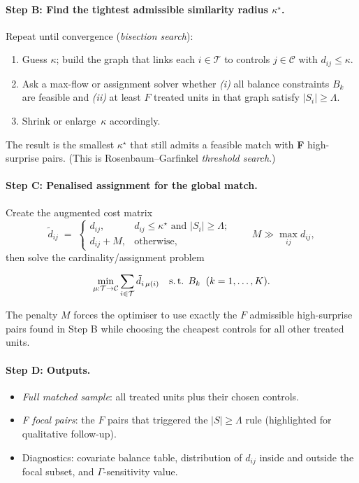 \documentclass[12pt,letterpaper]{article}  %
\begin{document}
\paragraph{Step B: Find the tightest admissible similarity radius $\kappa^\star$.}
Repeat until convergence (\emph{bisection search}):
\begin{enumerate}[label=\arabic*.]
    \item Guess $\kappa$; build the graph that links each $i\in\mathcal{T}$ to controls
          $j\in\mathcal{C}$ with $d_{ij}\le\kappa$.
    \item Ask a max-flow or assignment solver whether
          \emph{(i)} all balance constraints $B_k$ are feasible and
          \emph{(ii)} at least $F$ treated units in that graph satisfy
          $|S_i|\ge\Lambda$.
    \item Shrink or enlarge~$\kappa$ accordingly.
\end{enumerate}
The result is the smallest $\kappa^\star$ that still admits a feasible match with
\textbf{F} high-surprise pairs.  (This is Rosenbaum–Garfinkel
\emph{threshold search}.)

\paragraph{Step C: Penalised assignment for the global match.}
Create the augmented cost matrix
\[
\tilde d_{ij}\;=\;
\begin{cases}
    d_{ij}, & d_{ij}\le\kappa^\star\text{ and }|S_i|\ge\Lambda;\\[2pt]
    d_{ij}+M, & \text{otherwise},
\end{cases}
\qquad
M\gg\max\limits_{ij}d_{ij},
\]
then solve the cardinality/assignment problem

\[
\min_{\mu:\mathcal{T}\to\mathcal{C}}
        \sum_{i\in\mathcal{T}}\tilde d_{i\,\mu(i)}
\quad
\text{s.\,t. } B_k\;\;(k=1,\dots,K).
\]

The penalty $M$ forces the optimiser to use exactly the \(F\) admissible
high-surprise pairs found in Step B while choosing the cheapest controls for all
other treated units.

\paragraph{Step D: Outputs.}
\begin{itemize}[leftmargin=1.3em]
    \item \emph{Full matched sample}: all treated units plus their chosen controls.
    \item \emph{F focal pairs}: the \(F\) pairs that triggered the \(|S|\ge\Lambda\) rule
          (highlighted for qualitative follow-up).
    \item Diagnostics: covariate balance table, distribution of $d_{ij}$ inside and
          outside the focal subset, and $\Gamma$-sensitivity value.
\end{itemize}
\end{document}
